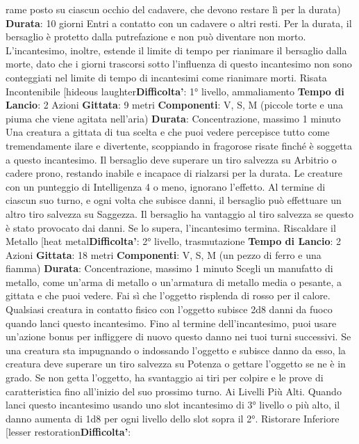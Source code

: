 \begin{multicols}{2}
rame posto su ciascun occhio del cadavere, che
devono restare lì per la durata)
\textbf{Durata}: 10 giorni
Entri a contatto con un cadavere o altri resti. Per la
durata, il bersaglio è protetto dalla putrefazione e non
può diventare non morto.
L’incantesimo, inoltre, estende il limite di tempo per
rianimare il bersaglio dalla morte, dato che i giorni
trascorsi sotto l’influenza di questo incantesimo non 
sono conteggiati nel limite di tempo di incantesimi come
rianimare morti.
Risata Incontenibile
[hideous laughter\textbf{Difficolta'}:
1° livello, ammaliamento
\textbf{Tempo di Lancio}: 2 Azioni
\textbf{Gittata}: 9 metri
\textbf{Componenti}: V, S, M (piccole torte e una piuma che
viene agitata nell’aria)
\textbf{Durata}: Concentrazione, massimo 1 minuto
Una creatura a gittata di tua scelta e che puoi vedere
percepisce tutto come tremendamente ilare e
divertente, scoppiando in fragorose risate finché è
soggetta a questo incantesimo. Il bersaglio deve
superare un tiro salvezza su Arbitrio o cadere prono,
restando inabile e incapace di rialzarsi per la durata. Le
creature con un punteggio di Intelligenza 4 o meno,
ignorano l’effetto.
Al termine di ciascun suo turno, e ogni volta che
subisce danni, il bersaglio può effettuare un altro tiro
salvezza su Saggezza. Il bersaglio ha vantaggio al tiro
salvezza se questo è stato provocato dai danni. Se lo
supera, l’incantesimo termina.
Riscaldare il Metallo
[heat metal\textbf{Difficolta'}:
2° livello, trasmutazione
\textbf{Tempo di Lancio}: 2 Azioni
\textbf{Gittata}: 18 metri
\textbf{Componenti}: V, S, M (un pezzo di ferro e una fiamma)
\textbf{Durata}: Concentrazione, massimo 1 minuto
Scegli un manufatto di metallo, come un’arma di
metallo o un’armatura di metallo media o pesante, a
gittata e che puoi vedere. Fai sì che l’oggetto risplenda
di rosso per il calore. Qualsiasi creatura in contatto
fisico con l’oggetto subisce 2d8 danni da fuoco quando
lanci questo incantesimo. Fino al termine
dell’incantesimo, puoi usare un’azione bonus per
infliggere di nuovo questo danno nei tuoi turni
successivi.
Se una creatura sta impugnando o indossando l’oggetto
e subisce danno da esso, la creatura deve superare un
tiro salvezza su Potenza o gettare l’oggetto se ne è
in grado. Se non getta l’oggetto, ha svantaggio ai tiri per
colpire e le prove di caratteristica fino all’inizio del suo
prossimo turno.
Ai Livelli Più Alti. Quando lanci questo incantesimo
usando uno slot incantesimo di 3° livello o più alto, il
danno aumenta di 1d8 per ogni livello dello slot sopra il
2°.
Ristorare Inferiore
[lesser restoration\textbf{Difficolta'}:

\end{multicols}

